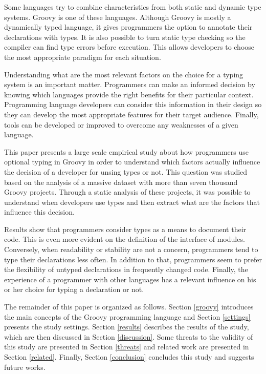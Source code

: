 \documentclass[preprint]{sigplanconf}
\begin{document}
Some languages try to combine characteristics from both static and dynamic type systems.
Groovy\cite{groovy} is one of these languages.
Although Groovy is mostly a dynamically typed language, it gives programmers the option to annotate their declarations with types.
It is also possible to turn static type checking so the compiler can find type errors before execution.
This allows developers to choose the most appropriate paradigm for each situation.

Understanding what are the most relevant factors on the choice for a typing system is an important matter.
Programmers can make an informed decision by knowing which languages provide the right benefits for their particular context.
Programming language developers can consider this information in their design so they can develop the most appropriate features for their target audience.
Finally, tools can be developed or improved to overcome any weaknesses of a given language. 

This paper presents a large scale empirical study about how programmers use optional typing in Groovy in order to understand which factors actually influence the decision of a developer for unsing types or not. 
This question was studied based on the analysis of a massive dataset with more than seven thousand Groovy projects.
Through a static analysis of these projects, it was possible to understand when developers use types and then extract what are the factors that influence this decision.

Results show that programmers consider types as a means to document their code.
This is even more evident on the definition of the interface of modules.
Conversely, when readability or stability are not a concern, programmers tend to type their declarations less often.
In addition to that, programmers seem to prefer the flexibility of untyped declarations in frequently changed code.
Finally, the experience of a programmer with other languages has a relevant influence on his or her choice for typing a declaration or not.

The remainder of this paper is organized as follows. 
Section \ref{groovy} introduces the main concepts of the Groovy programming language and Section \ref{settings} presents the study settings.
Section \ref{results} describes the results of the study, which are then discussed in Section \ref{discussion}.
Some threats to the validity of this study are presented in Section \ref{threats} and related work are presented in Section \ref{related}.
Finally, Section \ref{conclusion} concludes this study and suggests future works.
\end{document}
